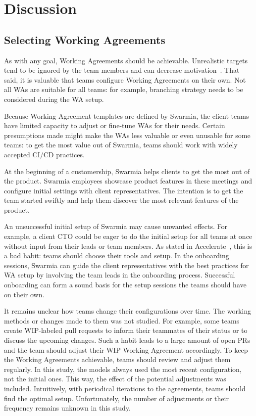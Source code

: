 \chapter{Discussion}

\section{Selecting Working Agreements}

As with any goal, Working Agreements should be achievable. Unrealistic targets tend to be ignored by the team members and can decrease motivation~\cite{forsgren_space_2021}. That said, it is valuable that teams configure Working Agreements on their own. Not all WAs are suitable for all teams: for example, branching strategy needs to be considered during the WA setup.  

Because Working Agreement templates are defined by Swarmia, the client teams have limited capacity to adjust or fine-tune WAs for their needs. Certain presumptions made might make the WAs less valuable or even unusable for some teams: to get the most value out of Swarmia, teams should work with widely accepted CI/CD practices. 

At the beginning of a customership, Swarmia helps clients to get the most out of the product. Swarmia employees showcase product features in these meetings and configure initial settings with client representatives. The intention is to get the team started swiftly and help them discover the most relevant features of the product.

An unsuccessful initial setup of Swarmia may cause unwanted effects. For example, a client CTO could be eager to do the initial setup for all teams at once without input from their leads or team members. As stated in Accelerate~\cite{forsgren_accelerate_2018}, this is a bad habit: teams should choose their tools and setup. In the onboarding sessions, Swarmia can guide the client representatives with the best practices for WA setup by involving the team leads in the onboarding process. Successful onboarding can form a sound basis for the setup sessions the teams should have on their own. 

It remains unclear how teams change their configurations over time. The working methods or changes made to them was not studied. For example, some teams create WIP-labeled pull requests to inform their teammates of their status or to discuss the upcoming changes. Such a habit leads to a large amount of open PRs and the team should adjust their WIP Working Agreement accordingly. To keep the Working Agreements achievable, teams should review and adjust them regularly. In this study, the models always used the most recent configuration, not the initial ones. This way, the effect of the potential adjustments was included. Intuitively, with periodical iterations to the agreements, teams should find the optimal setup. Unfortunately, the number of adjustments or their frequency remains unknown in this study. 

